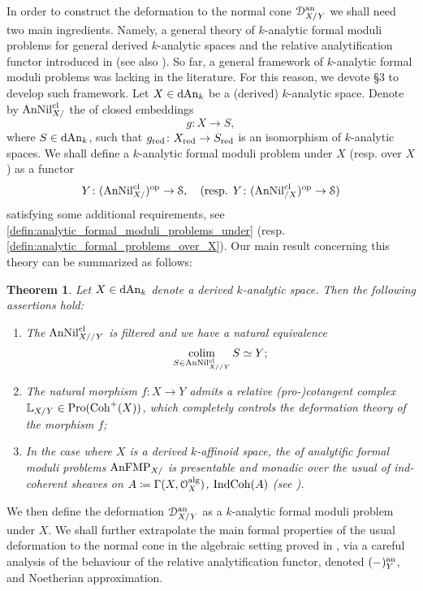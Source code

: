 \documentclass[10pt,a4paper,reqno]{amsart} %
\theoremstyle{plain}
\newtheorem{thm}{Theorem}[section]
\theoremstyle{definition}
\theoremstyle{remark}
\numberwithin{equation}{section}
\begin{document}
In order to construct the deformation to the normal cone $\mathcal D_{X/ Y}^\mathrm{an}$ we shall need two main ingredients. Namely, a general theory of $k$-analytic
formal moduli problems for general derived $k$-analytic spaces and the relative analytification functor introduced in \cite{Holstein_Analytification_of_mapping_stacks} (see also \cite[\S 6]{Porta_Yu_NQK}).
So far, a general framework of $k$-analytic formal moduli problems was lacking in the literature. For this reason, we devote \S 3
to develop such framework. Let $X \in \mathrm{dAn}_k$ be a (derived) $k$-analytic space. Denote by $\mathrm{AnNil}_{X/ }^{\mathrm{cl}}$ the \infcat of closed embeddings
    \[
        g\colon X \to S,  
    \]
where $S \in \mathrm{dAn}_k$, such that $g_{\mathrm{red}} \colon X_{\mathrm{red}} \to S_{\mathrm{red}}$ is an isomorphism of $k$-analytic spaces. We shall define a $k$-analytic formal moduli problem
under $X$ (resp. over $X$) as a functor
    \[
        Y \colon (\mathrm{AnNil}^{\mathrm{cl}}_{X/ })^ \mathrm{op} \to \mathcal S,  \quad \textrm{(resp. $Y \colon (\mathrm{AnNil}^{\mathrm{cl}}_{/ X}) ^\mathrm{op} \to \mathcal S$)}
    \]
satisfying some additional requirements, see \cref{defin:analytic_formal_moduli_problems_under} (resp. \cref{defin:analytic_formal_problems_over_X}).
Our main result concerning this theory can be summarized as follows:

\begin{thm}
    Let $X \in \mathrm{dAn}_k$ denote a derived $k$-analytic space. Then the following assertions hold:
    \begin{enumerate}
        \item The \infcat $\mathrm{AnNil}_{X/ /Y}^{\mathrm{cl}}$ is filtered and we have a natural equivalence
            \[
                \operatorname*{colim}_{S \in \mathrm{AnNil}^{\mathrm{cl}}_{X/ / Y}} S \simeq Y ; 
            \]
        \item The natural morphism $f \colon X \to Y$ admits a relative (pro-)cotangent complex $\mathbb L_{X/ Y} \in \mathrm{Pro}(\mathrm{Coh}^+(X))$, which completely controls the deformation
        theory of the morphism $f$;
        \item In the case where $X$ is a derived $k$-affinoid space, the \infcat of analytific formal moduli problems $\mathrm{AnFMP}_{X/ }$ is presentable and
        monadic over the usual \infcat of ind-coherent sheaves on $A \coloneqq \Gamma(X, \mathcal O_X^\mathrm{alg})$, $\mathrm{Ind}\mathrm{Coh}(A)$ (see \cite{Gaitsgory_IndCoh}).
    \end{enumerate}
\end{thm}

We then define the deformation $\mathcal D_{X/ Y}^\mathrm{an}$ as a $k$-analytic formal moduli problem
under $X$. We shall further extrapolate the main formal properties of the usual deformation to the normal cone in the algebraic setting proved in \cite[\S 9]{Gaitsgory_Study_II},
via a careful analysis of the behaviour of the relative analytification functor, denoted $(-)^\mathrm{an}_Y$, and Noetherian approximation.
\end{document}
